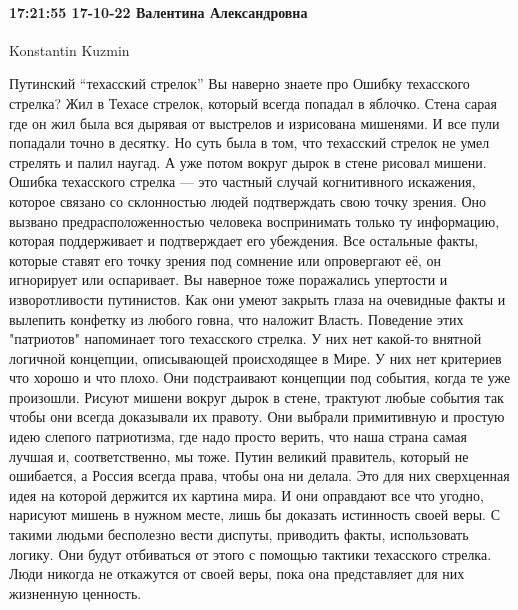  
 
 
 
 

\paragraph{17:21:55 17-10-22 Валентина Александровна}

Konstantin Kuzmin

Путинский “техасский стрелок”
Вы наверно знаете про Ошибку техасского стрелка?
Жил в Техасе стрелок, который всегда попадал в яблочко. Стена сарая где он жил была вся дырявая от выстрелов и изрисована мишенями. И все пули попадали точно в десятку. Но суть была в том, что техасский стрелок не умел стрелять и палил наугад. А уже потом вокруг дырок в стене рисовал мишени.
Ошибка техасского стрелка — это частный случай когнитивного искажения, которое связано со склонностью людей подтверждать свою точку зрения. Оно вызвано предрасположенностью человека воспринимать только ту информацию, которая поддерживает и подтверждает его убеждения. Все остальные факты, которые ставят его точку зрения под сомнение или опровергают её, он игнорирует или оспаривает.
Вы наверное тоже поражались упертости и изворотливости путинистов. Как они умеют закрыть глаза на очевидные факты и вылепить конфетку из любого говна, что наложит Власть.
Поведение этих "патриотов" напоминает того техасского стрелка. У них нет какой-то внятной логичной концепции, описывающей происходящее в Мире. У них нет критериев что хорошо и что плохо. Они подстраивают концепции под события, когда те уже произошли. Рисуют мишени вокруг дырок в стене, трактуют любые события так чтобы они всегда доказывали их правоту.
Они выбрали примитивную и простую идею слепого патриотизма, где надо просто верить, что наша страна самая лучшая и, соответственно, мы тоже. Путин великий правитель, который не ошибается, а Россия всегда права, чтобы она ни делала. Это для них сверхценная идея на которой держится их картина мира. И они оправдают все что угодно, нарисуют мишень в нужном месте, лишь бы доказать истинность своей веры.
С такими людьми бесполезно вести диспуты, приводить факты, использовать логику. Они будут отбиваться от этого с помощью тактики техасского стрелка.
Люди никогда не откажутся от своей веры, пока она представляет для них жизненную ценность.
